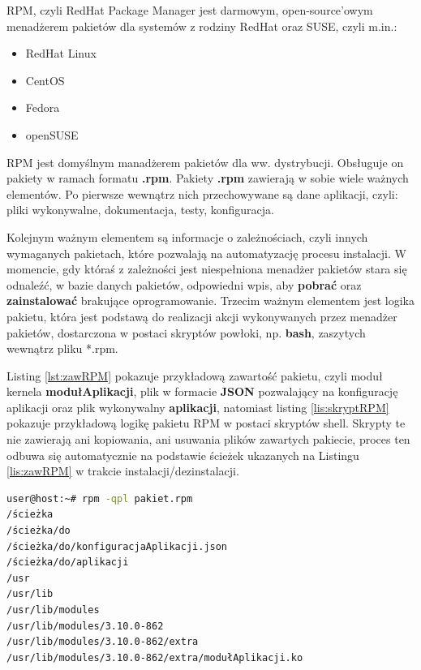 \newpage
RPM, czyli RedHat Package Manager jest darmowym, open-source'owym menadżerem pakietów dla systemów z rodziny RedHat oraz SUSE, czyli m.in.:
\begin{itemize}
\item RedHat Linux
\item CentOS
\item Fedora
\item openSUSE
\end{itemize}\par
RPM jest domyślnym manadżerem pakietów dla ww. dystrybucji. Obsługuje on pakiety w ramach formatu \textbf{.rpm}. Pakiety \textbf{.rpm} zawierają w sobie wiele ważnych elementów. Po pierwsze wewnątrz nich przechowywane są dane aplikacji, czyli: pliki wykonywalne, dokumentacja, testy, konfiguracja.\par 
Kolejnym ważnym elementem są informacje o zależnościach, czyli innych wymaganych pakietach, które pozwalają na automatyzację procesu instalacji. W momencie, gdy któraś z zależności jest niespełniona menadżer pakietów stara się odnaleźć, w bazie danych pakietów, odpowiedni wpis, aby \textbf{pobrać} oraz \textbf{zainstalować} brakujące oprogramowanie. Trzecim ważnym elementem jest logika pakietu, która jest podstawą do realizacji akcji wykonywanych przez menadżer pakietów, dostarczona w postaci skryptów powłoki, np. \textbf{bash}, zaszytych wewnątrz pliku *.rpm.

Listing \ref{lst:zawRPM} pokazuje przykładową zawartość pakietu, czyli moduł kernela \textbf{modułAplikacji}, plik w formacie \textbf{JSON} pozwalający na konfigurację aplikacji oraz plik wykonywalny \textbf{aplikacji}, natomiast  listing \ref{lis:skryptRPM} pokazuje przykładową logikę pakietu RPM w postaci skryptów shell. Skrypty te nie zawierają ani kopiowania, ani usuwania plików zawartych pakiecie, proces ten odbuwa się automatycznie na podstawie ścieżek ukazanych na Listingu \ref{lis:zawRPM} w trakcie instalacji/dezinstalacji.

\begin{lstlisting}[label={lst:zawRPM},language=bash,caption={Przykładowa zawartość pakietu RPM}]
user@host:~# rpm -qpl pakiet.rpm
/ścieżka
/ścieżka/do
/ścieżka/do/konfiguracjaAplikacji.json
/ścieżka/do/aplikacji
/usr
/usr/lib
/usr/lib/modules
/usr/lib/modules/3.10.0-862
/usr/lib/modules/3.10.0-862/extra
/usr/lib/modules/3.10.0-862/extra/modułAplikacji.ko
\end{lstlisting}

\newpage

